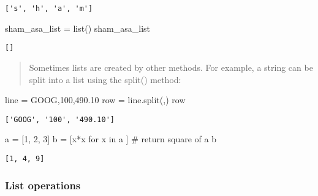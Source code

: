 \documentclass[
  letterpaper,
  DIV=11,
  numbers=noendperiod]{scrreprt}
\newenvironment{Shaded}{\begin{snugshade}}{\end{snugshade}}
\newcommand{\BuiltInTok}[1]{\textcolor[rgb]{0.00,0.46,0.62}{#1}}
\newcommand{\CommentTok}[1]{\textcolor[rgb]{0.37,0.37,0.37}{#1}}
\newcommand{\ControlFlowTok}[1]{\textcolor[rgb]{0.00,0.46,0.62}{#1}}
\newcommand{\DecValTok}[1]{\textcolor[rgb]{0.68,0.00,0.00}{#1}}
\newcommand{\KeywordTok}[1]{\textcolor[rgb]{0.00,0.46,0.62}{#1}}
\newcommand{\NormalTok}[1]{\textcolor[rgb]{0.00,0.46,0.62}{#1}}
\newcommand{\OperatorTok}[1]{\textcolor[rgb]{0.37,0.37,0.37}{#1}}
\newcommand{\StringTok}[1]{\textcolor[rgb]{0.13,0.47,0.30}{#1}}
\begin{document}
\begin{verbatim}
['s', 'h', 'a', 'm']
\end{verbatim}

\begin{Shaded}
\begin{Highlighting}[]
\NormalTok{sham\_asa\_list }\OperatorTok{=} \BuiltInTok{list}\NormalTok{()}
\NormalTok{sham\_asa\_list}
\end{Highlighting}
\end{Shaded}

\begin{verbatim}
[]
\end{verbatim}

\begin{quote}
Sometimes lists are created by other methods. For example, a string can
be split into a list using the split() method:
\end{quote}

\begin{Shaded}
\begin{Highlighting}[]
\NormalTok{line }\OperatorTok{=} \StringTok{\textquotesingle{}GOOG,100,490.10\textquotesingle{}}
\NormalTok{row }\OperatorTok{=}\NormalTok{ line.split(}\StringTok{\textquotesingle{},\textquotesingle{}}\NormalTok{)}
\NormalTok{row}
\end{Highlighting}
\end{Shaded}

\begin{verbatim}
['GOOG', '100', '490.10']
\end{verbatim}

\begin{Shaded}
\begin{Highlighting}[]
\NormalTok{a }\OperatorTok{=}\NormalTok{ [}\DecValTok{1}\NormalTok{, }\DecValTok{2}\NormalTok{, }\DecValTok{3}\NormalTok{]}
\NormalTok{b }\OperatorTok{=}\NormalTok{  [x}\OperatorTok{*}\NormalTok{x }\ControlFlowTok{for}\NormalTok{ x }\KeywordTok{in}\NormalTok{ a ] }\CommentTok{\# return square of a}
\NormalTok{b}
\end{Highlighting}
\end{Shaded}

\begin{verbatim}
[1, 4, 9]
\end{verbatim}

\hypertarget{list-operations}{%
\subsubsection{List operations}\label{list-operations}}
\end{document}

